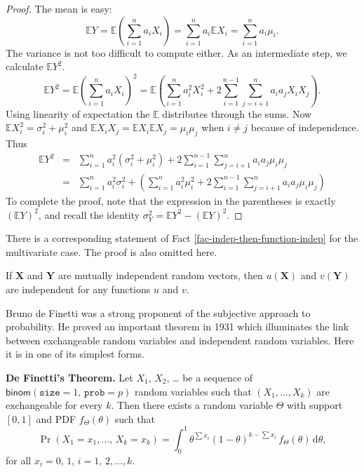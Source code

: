 \documentclass[captions=tableheading]{scrbook}
\begin{document}
\begin{proof}
The mean is easy:
\[
\mathbb{E} Y=\mathbb{E}\left(\sum_{i=1}^{n}a_{i}X_{i}\right)=\sum_{i=1}^{n}a_{i}\mathbb{E} X_{i}=\sum_{i=1}^{n}a_{i}\mu_{i}.
\]
The variance is not too difficult to compute either. As an intermediate step, we calculate \(\mathbb{E} Y^{2}\). 
\[
\mathbb{E} Y^{2}=\mathbb{E}\left(\sum_{i=1}^{n}a_{i}X_{i}\right)^{2}=\mathbb{E}\left(\sum_{i=1}^{n}a_{i}^{2}X_{i}^{2}+2\sum_{i=1}^{n-1}\sum_{j=i+1}^{n}a_{i}a_{j}X_{i}X_{j}\right).
\]
Using linearity of expectation the \(\mathbb{E}\) distributes through the sums. Now \(\mathbb{E} X_{i}^{2}=\sigma_{i}^{2}+\mu_{i}^{2}\) and \(\mathbb{E} X_{i}X_{j}=\mathbb{E} X_{i}\mathbb{E} X_{j}=\mu_{i}\mu_{j}\) when \(i\neq j\) because of independence. Thus
\begin{eqnarray*}
\mathbb{E} Y^{2} & = & \sum_{i=1}^{n}a_{i}^{2}(\sigma_{i}^{2}+\mu_{i}^{2})+2\sum_{i=1}^{n-1}\sum_{j=i+1}^{n}a_{i}a_{j}\mu_{i}\mu_{j}\\
 & = & \sum_{i=1}^{n}a_{i}^{2}\sigma_{i}^{2}+\left(\sum_{i=1}^{n}a_{i}^{2}\mu_{i}^{2}+2\sum_{i=1}^{n-1}\sum_{j=i+1}^{n}a_{i}a_{j}\mu_{i}\mu_{j}\right)
\end{eqnarray*}
To complete the proof, note that the expression in the parentheses is exactly \(\left(\mathbb{E} Y\right)^{2}\), and recall the identity \(\sigma_{Y}^{2}=\mathbb{E} Y^{2}-\left(\mathbb{E} Y\right)^{2}\).  
\end{proof}

There is a corresponding statement of Fact \ref{fac-indep-then-function-indep} for the multivariate case. The proof is also omitted here. 

\begin{fact}
If \(\mathbf{X}\) and \(\mathbf{Y}\) are mutually independent random vectors, then \(u(\mathbf{X})\) and \(v(\mathbf{Y})\) are independent for any functions \(u\) and \(v\).
\end{fact}

Bruno de Finetti was a strong proponent of the subjective approach to probability. He proved an important theorem in 1931 which illuminates the link between exchangeable random variables and independent random variables. Here it is in one of its simplest forms. 

\begin{thm}
\textbf{De Finetti's Theorem.} Let \(X_{1}\), \(X_{2}\), \ldots{} be a sequence of \(\mathsf{binom}(\mathtt{size}=1,\,\mathtt{prob}=p)\) random variables such that \((X_{1},\ldots,X_{k})\) are exchangeable for every \(k\). Then there exists a random variable \(\Theta\) with support \([0,1]\) and PDF \(f_{\Theta}(\theta)\) such that
\begin{equation}
\Pr(X_{1}=x_{1},\ldots,\, X_{k}=x_{k})=\int_{0}^{1}\theta^{\sum x_{i}}(1-\theta)^{k-\sum x_{i}}\, f_{\Theta}(\theta)\,\mathrm{d}\theta,\label{eq-definetti-binary}
\end{equation}
for all \(x_{i}=0,\,1\), \(i=1,\,2,\ldots,k\).
\end{thm}
\end{document}
